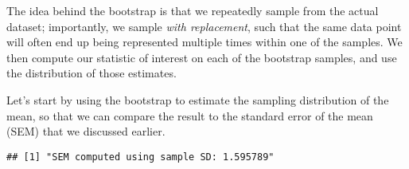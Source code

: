 \documentclass[]{book}
\newenvironment{Shaded}{\begin{snugshade}}{\end{snugshade}}
\newcommand{\KeywordTok}[1]{\textcolor[rgb]{0.13,0.29,0.53}{\textbf{#1}}}
\newcommand{\DataTypeTok}[1]{\textcolor[rgb]{0.13,0.29,0.53}{#1}}
\newcommand{\DecValTok}[1]{\textcolor[rgb]{0.00,0.00,0.81}{#1}}
\newcommand{\StringTok}[1]{\textcolor[rgb]{0.31,0.60,0.02}{#1}}
\newcommand{\CommentTok}[1]{\textcolor[rgb]{0.56,0.35,0.01}{\textit{#1}}}
\newcommand{\OtherTok}[1]{\textcolor[rgb]{0.56,0.35,0.01}{#1}}
\newcommand{\ControlFlowTok}[1]{\textcolor[rgb]{0.13,0.29,0.53}{\textbf{#1}}}
\newcommand{\OperatorTok}[1]{\textcolor[rgb]{0.81,0.36,0.00}{\textbf{#1}}}
\newcommand{\NormalTok}[1]{#1}
\theoremstyle{definition}
\theoremstyle{definition}
\theoremstyle{definition}
\theoremstyle{remark}
\begin{document}
The idea behind the bootstrap is that we repeatedly sample from the
actual dataset; importantly, we sample \emph{with replacement}, such
that the same data point will often end up being represented multiple
times within one of the samples. We then compute our statistic of
interest on each of the bootstrap samples, and use the distribution of
those estimates.

Let's start by using the bootstrap to estimate the sampling distribution
of the mean, so that we can compare the result to the standard error of
the mean (SEM) that we discussed earlier.

\begin{Shaded}
\end{Shaded}

\begin{verbatim}
## [1] "SEM computed using sample SD: 1.595789"
\end{verbatim}

\begin{Shaded}
\end{Shaded}
\end{document}
